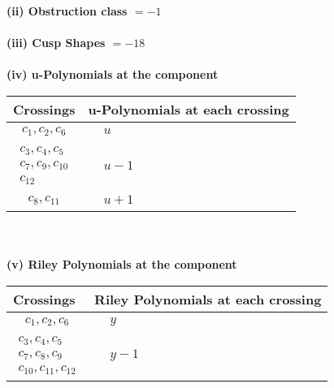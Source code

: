 \documentclass[1p]{elsarticle_modified}
\theoremstyle{definition}
\begin{document}
\flushleft \textbf{(ii) Obstruction class $= -1$}\\~\\
\flushleft \textbf{(iii) Cusp Shapes $= -18$}\\~\\
\newpage\renewcommand{\arraystretch}{1}
\flushleft \textbf{(iv) u-Polynomials at the component}\newline \\
\begin{tabular}{m{50pt}|m{274pt}}
Crossings & \hspace{64pt}u-Polynomials at each crossing \\
\hline $$\begin{aligned}c_{1},c_{2},c_{6}\end{aligned}$$&$\begin{aligned}
&u
\end{aligned}$\\
\hline $$\begin{aligned}c_{3},c_{4},c_{5}\\c_{7},c_{9},c_{10}\\c_{12}\end{aligned}$$&$\begin{aligned}
&u-1
\end{aligned}$\\
\hline $$\begin{aligned}c_{8},c_{11}\end{aligned}$$&$\begin{aligned}
&u+1
\end{aligned}$\\
\hline
\end{tabular}\\~\\
\newpage\renewcommand{\arraystretch}{1}
\flushleft \textbf{(v) Riley Polynomials at the component}\newline \\
\begin{tabular}{m{50pt}|m{274pt}}
Crossings & \hspace{64pt}Riley Polynomials at each crossing \\
\hline $$\begin{aligned}c_{1},c_{2},c_{6}\end{aligned}$$&$\begin{aligned}
&y
\end{aligned}$\\
\hline $$\begin{aligned}c_{3},c_{4},c_{5}\\c_{7},c_{8},c_{9}\\c_{10},c_{11},c_{12}\end{aligned}$$&$\begin{aligned}
&y-1
\end{aligned}$\\
\hline
\end{tabular}\\~\\
\end{document}
